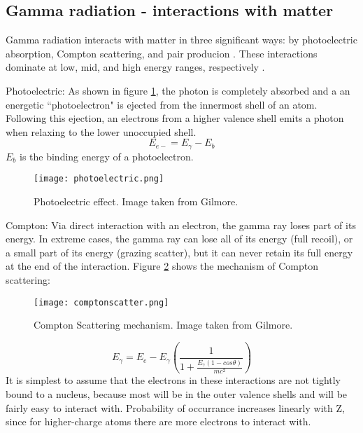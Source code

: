 \documentclass[12pt,twoside]{reedthesis}
\begin{document}
  
\subsection{Gamma radiation - interactions with matter}
 Gamma radiation interacts with matter in three significant ways: by photoelectric absorption, Compton scattering, and pair producion \cite{Knoll}. These interactions dominate at low, mid, and high energy ranges, respectively \cite{Gilmore}.

Photoelectric:  As shown in figure \ref{photo}, the photon is completely absorbed and a an energetic ``photoelectron" is ejected from the innermost shell of an atom. Following this ejection, an electrons from a higher valence shell emits a photon when relaxing to the lower unoccupied shell.
  \begin{equation}
     E_{e-} = E_{\gamma} - E_{b}
     \label{photoelec}
     \end{equation}
 $E_{b}$ is the binding energy of a photoelectron.
 \begin{figure}[h!]
	       \centering
	    \texttt{[image: photoelectric.png]}
	     \caption{Photoelectric effect. Image taken from Gilmore.}
	 \label{photo}
	\end{figure}
 
Compton: Via direct interaction with an electron, the gamma ray loses part of its energy. In extreme cases, the gamma ray can lose all of its energy (full recoil), or a small part of its energy (grazing scatter), but it can never retain its full energy at the end of the interaction. Figure \ref{compt} shows the mechanism of Compton scattering:
 \begin{figure}[h!]
	       \centering
	    \texttt{[image: comptonscatter.png]}
	     \caption{Compton Scattering mechanism. Image taken from Gilmore.}
	 \label{compt}
	\end{figure}
	  \begin{equation}
     E_{\gamma} = E_{e} - E_{\gamma}\left(\frac{1}{1+ \frac{E_{\gamma}(1-cos\theta)}{mc^{2}}}\right)
     \label{photoelec}
     \end{equation}
	It is simplest to assume that the electrons in these interactions are not tightly bound to a nucleus, because most will be in the outer valence shells and will be fairly easy to interact with. Probability of occurrance increases linearly with Z, since for higher-charge atoms there are more electrons to interact with.
	
\end{document}
